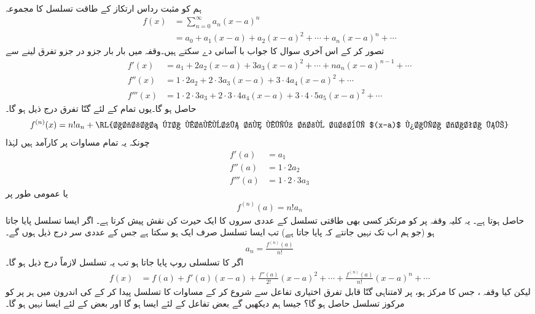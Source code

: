 ہم   کو مثبت رداس ارتکاز کے طاقت تسلسل کا مجموعہ 
\begin{align*}
f(x)&=\sum_{n=0}^{\infty}a_n(x-a)^n\\
&=a_0+a_1(x-a)+a_2(x-a)^2+\cdots+a_n(x-a)^n+\cdots
\end{align*}
تصور کر کے اس آخری سوال کا جواب با آسانی دے سکتے ہیں۔وقفہ  میں  بار بار جزو در جزو تفرق لینے سے 
\begin{align*}
f'(x)&=a_1+2a_2(x-a)+3a_3(x-a)^2+\cdots+na_n(x-a)^{n-1}+\cdots\\
f''(x)&=1\cdot 2a_2+2\cdot 3a_3(x-a)+3\cdot 4a_4(x-a)^2+\cdots\\
f'''(x)&=1\cdot2\cdot3a_3+2\cdot3\cdot4a_4(x-a)+3\cdot4\cdot5a_5(x-a)^2+\cdots
\end{align*}
حاصل ہو گا۔یوں تمام  کے لئے  گنّا تفرق درج ذیل ہو گا۔
\begin{align*}
f^{(n)}(x)=n!a_n+\text{\RL{اجزاء کا مجموعہ جن میں جزو ضربی $(x-a)$ پایا جاتا ہے}}
\end{align*}
چونکہ یہ تمام مساوات  پر کارآمد ہیں لہٰذا 
\begin{align*}
f'(a)&=a_1\\
f''(a)&=1\cdot 2 a_2\\
f'''(a)&=1\cdot 2\cdot 3a_3
\end{align*}
یا عمومی طور پر
\begin{align*}
f^{(n)}(a)=n!a_n
\end{align*}
حاصل ہوتا ہے۔ یہ کلیہ وقفہ  پر  کو مرتکز کسی بھی طاقتی تسلسل  کے عددی سروں کا ایک حیرت کن نقش پیش کرتا ہے۔ اگر ایسا تسلسل پایا جاتا ہو (جو ہم اب تک نہیں جانتے کہ پایا جاتا ہے) تب ایسا تسلسل صرف ایک ہو سکتا ہے جس کے  عددی سر درج ذیل ہوں گے۔
\begin{align*}
a_n=\frac{f^{(n)}(a)}{n!}
\end{align*}
اگر  کا تسلسلی روپ پایا جاتا ہو تب یہ تسلسل لازماً درج ذیل ہو گا۔
\begin{align}\label{مساوات_تسلسل_عمومی_تسلسل}
f(x)&=f(a)+f'(a)(x-a)+\frac{f''(a)}{2!}(x-a)^2+\cdots+\frac{f^{(n)}(a)}{n!}(x-a)^n+\cdots
\end{align}
لیکن کیا وقفہ ، جس کا مرکز  ہو، پر  لامتناہی گنّا قابل تفرق اختیاری تفاعل  سے شروع کر کے مساوات  کا تسلسل پیدا کر کے  کی اندرون میں ہر  پر  کو مرکوز تسلسل حاصل ہو گا؟ جیسا ہم دیکھیں گے  بعض تفاعل کے لئے ایسا ہو گا اور بعض کے لئے ایسا نہیں ہو گا۔


